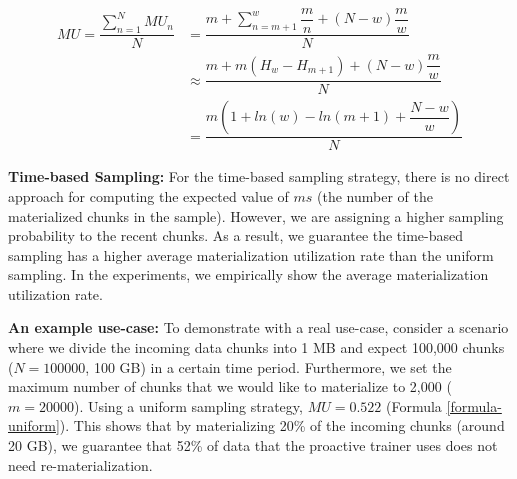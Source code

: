 \begin{equation} \label{formula-window-based}
\begin{aligned}
MU=\dfrac{\sum\limits_{n=1}^N MU_n}{N}
&=\dfrac{m + \sum\limits_{n = m+1}^{w} \dfrac{m}{n} + (N-w)\dfrac{m}{w} }{N} \\
&\approx\dfrac{m  +  m (H_w - H_{m+1}) + (N-w)\dfrac{m}{w}}{N}\\
&=\dfrac{m(1 + ln(w) - ln(m+1) + \dfrac{N-w}{w})}{N}
\end{aligned}
\end{equation}

\textbf{Time-based Sampling:}
For the time-based sampling strategy, there is no direct approach for computing the expected value of $ms$ (the number of the materialized chunks in the sample).
However, we are assigning a higher sampling probability to the recent chunks.
As a result, we guarantee the time-based sampling has a higher average materialization utilization rate than the uniform sampling.
In the experiments, we empirically show the average materialization utilization rate.

\textbf{An example use-case:}
To demonstrate with a real use-case, consider a scenario where we divide the incoming data chunks into 1 MB and expect 100,000 chunks ($N = 100000$, 100 GB) in a certain time period.
Furthermore, we set the maximum number of chunks that we would like to materialize to 2,000 ($m=20000$).
Using a uniform sampling strategy, $MU =0.522 $ (Formula \ref{formula-uniform}).
This shows that by materializing 20\% of the incoming chunks (around 20 GB), we guarantee that 52\% of data that the proactive trainer uses does not need re-materialization.


